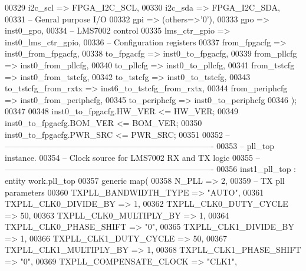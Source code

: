 \begin{DoxyCode}
00329       i2c_scl                    => FPGA_I2C_SCL,
00330       i2c_sda                    => FPGA_I2C_SDA,
00331 \textcolor{keyword}{      -- Genral purpose I/O}
00332       gpi                        => \textcolor{vhdlchar}{(}\textcolor{keywordflow}{others}=>'0'\textcolor{vhdlchar}{)},
00333       gpo                        => inst0_gpo, 
00334 \textcolor{keyword}{      -- LMS7002 control }
00335       lms_ctr_gpio               => inst0_lms_ctr_gpio,
00336 \textcolor{keyword}{      -- Configuration registers}
00337       from\_fpgacfg               => inst0_from_fpgacfg,
00338       to\_fpgacfg                 => inst0_to_fpgacfg,
00339       from\_pllcfg                => inst0_from_pllcfg,
00340       to\_pllcfg                  => inst0_to_pllcfg,
00341       from\_tstcfg                => inst0_from_tstcfg,
00342       to\_tstcfg                  => inst0_to_tstcfg,
00343       to\_tstcfg\_from\_rxtx        => inst6_to_tstcfg_from_rxtx,
00344       from\_periphcfg             => inst0_from_periphcfg,
00345       to\_periphcfg               => inst0_to_periphcfg
00346    \textcolor{vhdlchar}{)};
00347    
00348    inst0\_to\_fpgacfg.HW\_VER    <= HW\_VER;
00349    inst0\_to\_fpgacfg.BOM\_VER   <= BOM\_VER; 
00350    inst0\_to\_fpgacfg.PWR\_SRC   <= PWR\_SRC;
00351    
00352 \textcolor{keyword}{-- ----------------------------------------------------------------------------}
00353 \textcolor{keyword}{-- pll\_top instance.}
00354 \textcolor{keyword}{-- Clock source for LMS7002 RX and TX logic}
00355 \textcolor{keyword}{-- ----------------------------------------------------------------------------   }
00356    inst1\_pll\_top : \textcolor{keywordflow}{entity} work.pll_top
00357    \textcolor{keywordflow}{generic} \textcolor{keywordflow}{map}(
00358       N_PLL                         => \textcolor{vhdllogic}{2},
00359 \textcolor{keyword}{      -- TX pll parameters          }
00360       TXPLL_BANDWIDTH_TYPE          => \textcolor{keyword}{"AUTO"},
00361       TXPLL_CLK0_DIVIDE_BY          => \textcolor{vhdllogic}{1},
00362       TXPLL_CLK0_DUTY_CYCLE         => \textcolor{vhdllogic}{50},
00363       TXPLL_CLK0_MULTIPLY_BY        => \textcolor{vhdllogic}{1},
00364       TXPLL_CLK0_PHASE_SHIFT        => "\textcolor{vhdllogic}{0}",
00365       TXPLL_CLK1_DIVIDE_BY          => \textcolor{vhdllogic}{1},
00366       TXPLL_CLK1_DUTY_CYCLE         => \textcolor{vhdllogic}{50},
00367       TXPLL_CLK1_MULTIPLY_BY        => \textcolor{vhdllogic}{1},
00368       TXPLL_CLK1_PHASE_SHIFT        => "\textcolor{vhdllogic}{0}",
00369       TXPLL_COMPENSATE_CLOCK        => \textcolor{keyword}{"CLK1"},

\end{DoxyCode}
